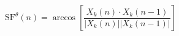 \documentclass{article}
\begin{document}
 
\[
\mbox{SF}^{\theta}(n) =  \arccos \left[ \frac{X_k(n) \cdot X_k(n-1)}
   {|X_k(n)| |X_k(n-1)| } \right]
\]
 \newpage 
\end{document}

